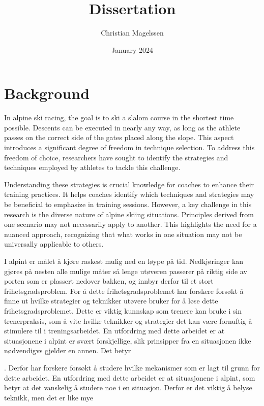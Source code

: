 \documentclass[letterpaper,10pt]{article}
\title{Dissertation}
\author{Christian Magelssen}
\date{January 2024}
\begin{document}
\maketitle

\section{Background}

In alpine ski racing, the goal is to ski a slalom course in the shortest time possible. Descents can be executed in nearly any way, as long as the athlete passes on the correct side of the gates placed along the slope. This aspect introduces a significant degree of freedom in technique selection. To address this freedom of choice, researchers have sought to identify the strategies and techniques employed by athletes to tackle this challenge.

Understanding these strategies is crucial knowledge for coaches to enhance their training practices. It helps coaches identify which techniques and strategies may be beneficial to emphasize in training sessions. However, a key challenge in this research is the diverse nature of alpine skiing situations. Principles derived from one scenario may not necessarily apply to another. This highlights the need for a nuanced approach, recognizing that what works in one situation may not be universally applicable to others.



I alpint er målet å kjøre raskest mulig ned en løype på tid. Nedkjøringer kan gjøres på nesten alle mulige måter så lenge utøveren passerer på riktig side av porten som er plassert nedover bakken, og innbyr derfor til et stort frihetsgradsproblem. For å dette frihetsgradsproblemet har forskere forsøkt å finne ut hvilke strategier og teknikker utøvere bruker for å løse dette frihetsgradsproblemet. Dette er viktig kunnskap som trenere kan bruke i sin trenerpraksis, som å vite hvilke teknikker og strategier det kan være fornuftig å stimulere til i treningsarbeidet. En utfordring med dette arbeidet er at situasjonene i alpint er svært forskjellige, slik prinsipper fra en situasjonen ikke nødvendigvs gjelder en annen. Det betyr 


. Derfor har forskere forsøkt å studere hvilke mekanismer som er lagt til grunn for dette arbeidet. En utfordring med dette arbeidet er at situasjonene i alpint, som betyr at det vanskelig å studere noe i en situasjon. Derfor er det viktig å belyse teknikk, men det er like mye 
\end{document}

